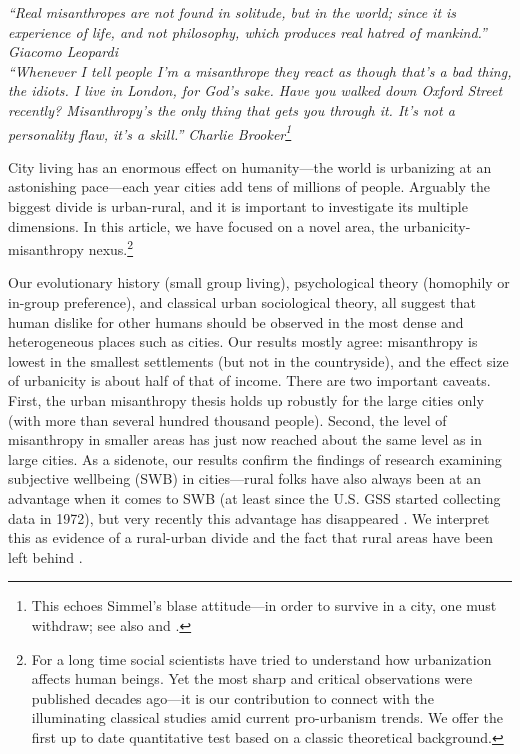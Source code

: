 \documentclass[11pt, letterpaper]{article}
\begin{document}
\begin{spacing}{1.4}
{\small\it \noindent ``Real misanthropes are not found in solitude, but in the world; since
it is experience of life, and not philosophy, which produces real hatred of
mankind.'' Giacomo Leopardi\\

\noindent ``Whenever I tell people I'm a misanthrope they react as though that's a bad thing, the idiots. I live in London, for God's sake. Have you walked down Oxford Street recently? Misanthropy's the only thing that gets you through it. It's not a personality flaw, it's a skill.'' Charlie Brooker\footnote{This echoes Simmel's blase attitude---in order to survive in a city, one must withdraw; see also \citet{milgram70} and \citet{lederbogen11}.}\\}

City living has an enormous effect on humanity---the world is urbanizing at
an astonishing pace---each year cities add tens of millions of people. Arguably the biggest divide is urban-rural, and it is important to investigate its multiple dimensions. In this article, we have focused on a novel area, the urbanicity-misanthropy nexus.\footnote{For a long time social scientists have tried to understand how urbanization affects human beings. Yet the most sharp and critical observations were published decades ago---it is our contribution to connect with the illuminating classical studies amid current pro-urbanism trends. We offer the first up to date quantitative test based on a classic theoretical background.}   
 
Our evolutionary history (small group living),  psychological theory (homophily or in-group preference), and classical urban sociological theory, all suggest that human dislike for other humans should be observed in the most dense and heterogeneous places such as cities. Our results mostly agree: misanthropy is lowest in the smallest settlements (but not in the countryside), and the effect size of urbanicity is about half of that of income.
%
There are two important caveats. First, the urban misanthropy thesis holds up robustly for the large cities only (with more than several hundred thousand people). Second, the level of misanthropy in smaller areas has just now reached about the same level as in large cities.  
% 
As a sidenote, our results confirm the findings of research examining subjective wellbeing (SWB) in cities---rural folks have also
always been at an advantage when it comes to SWB (at least since the U.S. GSS
started collecting data in 1972), but very recently this advantage has disappeared \citep{aok-swbGenYcity18}. We interpret this as evidence of a rural-urban divide and the fact that rural areas have been left behind \citep[e.g.,][]{fullerNYT17monD, hansonCityJournalautumn15}.


\end{spacing}
\end{document}
